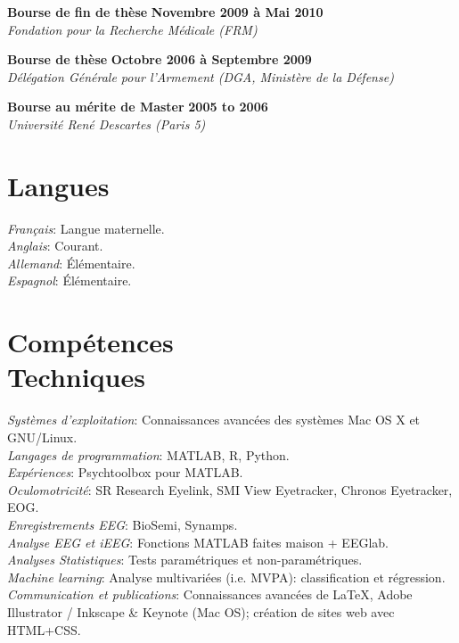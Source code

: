 \documentclass[margin,line]{resume}
\begin{document}
\begin{resume}
	\vspace{-2mm} 
	\textbf{Bourse de fin de thèse} \hfill \textbf{Novembre 2009 à Mai 2010}\\
	\textsl{Fondation pour la Recherche Médicale (FRM)}
		
	\vspace{-2mm} 
	\textbf{Bourse de thèse} \hfill \textbf{Octobre 2006 à Septembre 2009}\\ %
	\textsl{Délégation Générale pour l'Armement (DGA, Ministère de la Défense)}
	
	\vspace{-2mm} 
	\textbf{Bourse au mérite  de Master} \hfill \textbf{2005 to 2006}\\
	\textsl{Université René Descartes (Paris 5)}	


	
\vspace{3mm}
\section{\mysidestyle Langues}
	\textsl{Français}: Langue maternelle.\\
	\textsl{Anglais}: Courant.\\
	\textsl{Allemand}: \'Elémentaire.\\
	\textsl{Espagnol}: \'Elémentaire.


\vspace{3mm}
\section{\mysidestyle Compétences\\Techniques}
	\textsl{Systèmes d'exploitation}: Connaissances avancées des systèmes Mac OS X et GNU/Linux.\\
	\textsl{Langages de programmation}: MATLAB, R, Python.\\
	\textsl{Expériences}: Psychtoolbox pour MATLAB.\\
	\textsl{Oculomotricité}: SR Research Eyelink, SMI View Eyetracker, Chronos Eyetracker, EOG.\\
	\textsl{Enregistrements EEG}: BioSemi, Synamps.\\
	\textsl{Analyse EEG et iEEG}: Fonctions MATLAB faites maison + EEGlab.\\
	\textsl{Analyses Statistiques}: Tests paramétriques et non-paramétriques.\\
	\textsl{Machine learning}: Analyse multivariées (i.e. MVPA): classification et régression.\\
	\textsl{Communication et publications}: Connaissances avancées de \LaTeX, Adobe Illustrator / Inkscape \& Keynote (Mac OS); création de sites web avec HTML+CSS.



\end{resume}
\end{document}
